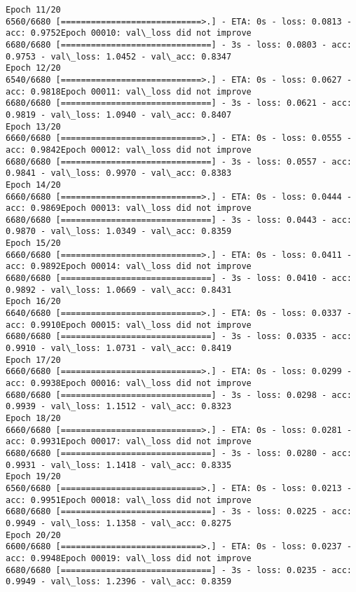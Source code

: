 \documentclass[11pt]{article}
\begin{document}
\begin{Verbatim}[commandchars=\\\{\}]
Epoch 11/20
6560/6680 [============================>.] - ETA: 0s - loss: 0.0813 - acc: 0.9752Epoch 00010: val\_loss did not improve
6680/6680 [==============================] - 3s - loss: 0.0803 - acc: 0.9753 - val\_loss: 1.0452 - val\_acc: 0.8347
Epoch 12/20
6540/6680 [============================>.] - ETA: 0s - loss: 0.0627 - acc: 0.9818Epoch 00011: val\_loss did not improve
6680/6680 [==============================] - 3s - loss: 0.0621 - acc: 0.9819 - val\_loss: 1.0940 - val\_acc: 0.8407
Epoch 13/20
6660/6680 [============================>.] - ETA: 0s - loss: 0.0555 - acc: 0.9842Epoch 00012: val\_loss did not improve
6680/6680 [==============================] - 3s - loss: 0.0557 - acc: 0.9841 - val\_loss: 0.9970 - val\_acc: 0.8383
Epoch 14/20
6660/6680 [============================>.] - ETA: 0s - loss: 0.0444 - acc: 0.9869Epoch 00013: val\_loss did not improve
6680/6680 [==============================] - 3s - loss: 0.0443 - acc: 0.9870 - val\_loss: 1.0349 - val\_acc: 0.8359
Epoch 15/20
6660/6680 [============================>.] - ETA: 0s - loss: 0.0411 - acc: 0.9892Epoch 00014: val\_loss did not improve
6680/6680 [==============================] - 3s - loss: 0.0410 - acc: 0.9892 - val\_loss: 1.0669 - val\_acc: 0.8431
Epoch 16/20
6640/6680 [============================>.] - ETA: 0s - loss: 0.0337 - acc: 0.9910Epoch 00015: val\_loss did not improve
6680/6680 [==============================] - 3s - loss: 0.0335 - acc: 0.9910 - val\_loss: 1.0731 - val\_acc: 0.8419
Epoch 17/20
6660/6680 [============================>.] - ETA: 0s - loss: 0.0299 - acc: 0.9938Epoch 00016: val\_loss did not improve
6680/6680 [==============================] - 3s - loss: 0.0298 - acc: 0.9939 - val\_loss: 1.1512 - val\_acc: 0.8323
Epoch 18/20
6660/6680 [============================>.] - ETA: 0s - loss: 0.0281 - acc: 0.9931Epoch 00017: val\_loss did not improve
6680/6680 [==============================] - 3s - loss: 0.0280 - acc: 0.9931 - val\_loss: 1.1418 - val\_acc: 0.8335
Epoch 19/20
6560/6680 [============================>.] - ETA: 0s - loss: 0.0213 - acc: 0.9951Epoch 00018: val\_loss did not improve
6680/6680 [==============================] - 3s - loss: 0.0225 - acc: 0.9949 - val\_loss: 1.1358 - val\_acc: 0.8275
Epoch 20/20
6600/6680 [============================>.] - ETA: 0s - loss: 0.0237 - acc: 0.9948Epoch 00019: val\_loss did not improve
6680/6680 [==============================] - 3s - loss: 0.0235 - acc: 0.9949 - val\_loss: 1.2396 - val\_acc: 0.8359

    \end{Verbatim}
\end{document}
